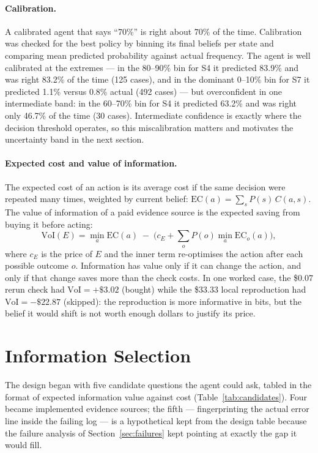 \documentclass{article}
\begin{document}
\paragraph{Calibration.} A calibrated agent that says ``70\%'' is right about 70\% of the time. Calibration was checked for the best policy by binning its final beliefs per state and comparing mean predicted probability against actual frequency. The agent is well calibrated at the extremes --- in the 80--90\% bin for S4 it predicted 83.9\% and was right 83.2\% of the time (125 cases), and in the dominant 0--10\% bin for S7 it predicted 1.1\% versus 0.8\% actual (492 cases) --- but overconfident in one intermediate band: in the 60--70\% bin for S4 it predicted 63.2\% and was right only 46.7\% of the time (30 cases). Intermediate confidence is exactly where the decision threshold operates, so this miscalibration matters and motivates the uncertainty band in the next section.

\paragraph{Expected cost and value of information.} The expected cost of an action is its average cost if the same decision were repeated many times, weighted by current belief:
$\mathrm{EC}(a) = \sum_s P(s)\, C(a, s)$.
The value of information of a paid evidence source is the expected saving from buying it before acting:
\begin{equation}
\mathrm{VoI}(E) = \min_a \mathrm{EC}(a) \;-\; \Big( c_E + \sum_o P(o) \min_a \mathrm{EC}_o(a) \Big),
\label{eq:voi}
\end{equation}
where $c_E$ is the price of $E$ and the inner term re-optimises the action after each possible outcome $o$. Information has value only if it can change the action, and only if that change saves more than the check costs. In one worked case, the \$0.07 rerun check had $\mathrm{VoI} = +\$3.02$ (bought) while the \$33.33 local reproduction had $\mathrm{VoI} = -\$22.87$ (skipped): the reproduction is more informative in bits, but the belief it would shift is not worth enough dollars to justify its price.

\section{Information Selection}
\label{sec:selection}

The design began with five candidate questions the agent could ask, tabled in the format of expected information value against cost (Table~\ref{tab:candidates}). Four became implemented evidence sources; the fifth --- fingerprinting the actual error line inside the failing log --- is a hypothetical kept from the design table because the failure analysis of Section~\ref{sec:failures} kept pointing at exactly the gap it would fill.
\end{document}
